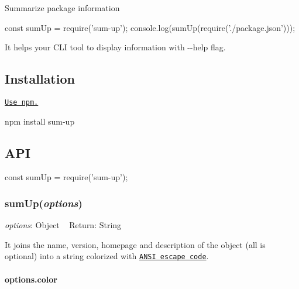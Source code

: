 \href{https://www.npmjs.com/package/sum-up}{\tt } \href{https://travis-ci.org/shinnn/sum-up}{\tt } \href{https://coveralls.io/r/shinnn/sum-up}{\tt } \href{https://david-dm.org/shinnn/sum-up}{\tt } \href{https://david-dm.org/shinnn/sum-up#info=devDependencies}{\tt }

Summarize package information


\begin{DoxyCode}
const sumUp = require('sum-up');
console.log(sumUp(require('./package.json')));
\end{DoxyCode}




It helps your C\+LI tool to display information with {\ttfamily -\/-\/help} flag.

\subsection*{Installation}

\href{https://docs.npmjs.com/cli/install}{\tt Use npm.}


\begin{DoxyCode}
npm install sum-up
\end{DoxyCode}


\subsection*{A\+PI}


\begin{DoxyCode}
const sumUp = require('sum-up');
\end{DoxyCode}


\subsubsection*{sum\+Up({\itshape options})}

{\itshape options}\+: {\ttfamily Object} ~\newline
Return\+: {\ttfamily String}

It joins the {\ttfamily name}, {\ttfamily version}, {\ttfamily homepage} and {\ttfamily description} of the object (all is optional) into a string colorized with \href{https://github.com/sindresorhus/ansi-styles}{\tt A\+N\+SI escape code}.

\paragraph*{options.\+color}

